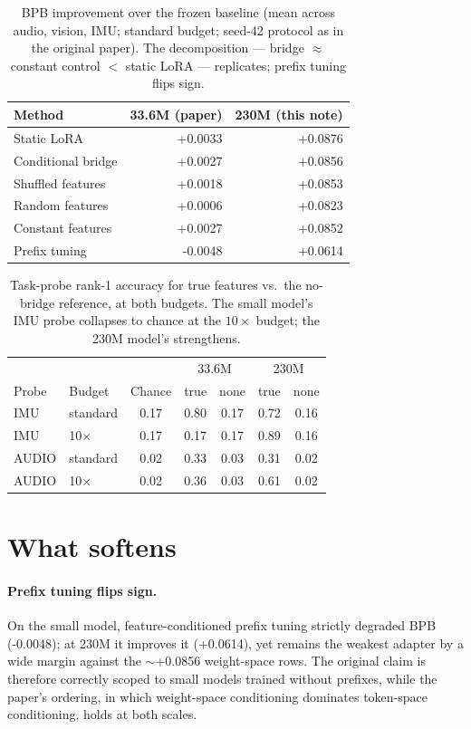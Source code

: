 \documentclass[11pt]{article}
\begin{document}
\begin{table}[t]
\centering
\caption{BPB improvement over the frozen baseline (mean across audio, vision, IMU; standard budget; seed-42 protocol as in the original paper). The decomposition --- bridge $\approx$ constant control $<$ static LoRA --- replicates; prefix tuning flips sign.}
\label{tab:bpb}
\begin{tabular}{lrr}
\toprule
Method & 33.6M (paper) & 230M (this note) \\
\midrule
Static LoRA & +0.0033 & +0.0876 \\
Conditional bridge & +0.0027 & +0.0856 \\
Shuffled features & +0.0018 & +0.0853 \\
Random features & +0.0006 & +0.0823 \\
Constant features & +0.0027 & +0.0852 \\
Prefix tuning & -0.0048 & +0.0614 \\
\bottomrule
\end{tabular}
\end{table}

\begin{table}[t]
\centering
\caption{Task-probe rank-1 accuracy for true features vs.\ the no-bridge reference, at both budgets. The small model's IMU probe collapses to chance at the $10\times$ budget; the 230M model's strengthens.}
\label{tab:task}
\begin{tabular}{llccccc}
\toprule
 & & & \multicolumn{2}{c}{33.6M} & \multicolumn{2}{c}{230M} \\
Probe & Budget & Chance & true & none & true & none \\
\midrule
IMU & standard & 0.17 & 0.80 & 0.17 & 0.72 & 0.16 \\
IMU & 10$\times$ & 0.17 & 0.17 & 0.17 & 0.89 & 0.16 \\
AUDIO & standard & 0.02 & 0.33 & 0.03 & 0.31 & 0.02 \\
AUDIO & 10$\times$ & 0.02 & 0.36 & 0.03 & 0.61 & 0.02 \\
\bottomrule
\end{tabular}
\end{table}

\section{What softens}
\paragraph{Prefix tuning flips sign.}
On the small model, feature-conditioned prefix tuning strictly degraded BPB (-0.0048); at 230M it improves it (+0.0614), yet remains the weakest adapter by a wide margin against the $\sim$+0.0856 weight-space rows. The original claim is therefore correctly scoped to small models trained without prefixes, while the paper's ordering, in which weight-space conditioning dominates token-space conditioning, holds at both scales.
\end{document}
